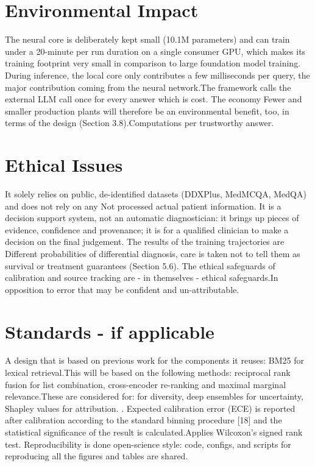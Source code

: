 \section{Environmental Impact}
The neural core is deliberately kept small (10.1M parameters) and can train under a 20-minute per run duration on a single consumer GPU, which makes its training footprint very small in comparison to large foundation model training. During inference, the local core only contributes a few milliseconds per query, the major contribution coming from the neural network.The framework calls the external LLM call once for every answer which is cost. The economy Fewer and smaller production plants will therefore be an environmental benefit, too, in terms of the design (Section 3.8).Computations per trustworthy answer. 

\section{Ethical Issues}
It solely relies on public, de-identified datasets (DDXPlus, MedMCQA, MedQA) and does not rely on any Not processed actual patient information. It is a decision support system, not an automatic diagnostician: it brings up pieces of evidence, confidence and provenance; it is for a qualified clinician to make a decision on the final judgement. The results of the training trajectories are Different probabilities of differential diagnosis, care is taken not to tell them as survival or treatment guarantees (Section 5.6). The ethical safeguards of calibration and source tracking are - in themselves - ethical safeguards.In opposition to error that may be confident and un-attributable.

\section{Standards - if applicable}
A design that is based on previous work for the components it reuses: BM25 for lexical retrieval.This will be based on the following methods: reciprocal rank fusion for list combination, cross-encoder re-ranking and maximal marginal relevance.These are considered for: for diversity, deep ensembles for uncertainty, Shapley values for attribution. . Expected calibration error (ECE) is reported after calibration according to the standard binning procedure [18] and the statistical significance of the result is calculated.Applies Wilcoxon's signed rank test. Reproducibility is done open-science style: code, configs, and scripts for reproducing all the figures and tables are shared.


